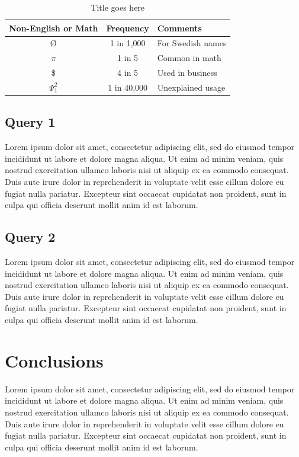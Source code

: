 \documentclass{sig-alternate-05-2015}
\begin{document}
\begin{table}
	\centering
	\caption{Title goes here}
	\begin{tabular}{|c|c|l|}
		\hline
		Non-English or Math&Frequency&Comments\\ \hline
		\O & 1 in 1,000& For Swedish names\\ \hline
		$\pi$ & 1 in 5& Common in math\\ \hline
		\$ & 4 in 5 & Used in business\\ \hline
		$\Psi^2_1$ & 1 in 40,000& Unexplained usage\\
		\hline
	\end{tabular}
\end{table}

\subsection{Query 1}
Lorem ipsum dolor sit amet, consectetur adipiscing elit, sed do eiusmod tempor incididunt ut labore et dolore magna aliqua. Ut enim ad minim veniam, quis nostrud exercitation ullamco laboris nisi ut aliquip ex ea commodo consequat. Duis aute irure dolor in reprehenderit in voluptate velit esse cillum dolore eu fugiat nulla pariatur. Excepteur sint occaecat cupidatat non proident, sunt in culpa qui officia deserunt mollit anim id est laborum.

\subsection{Query 2}
Lorem ipsum dolor sit amet, consectetur adipiscing elit, sed do eiusmod tempor incididunt ut labore et dolore magna aliqua. Ut enim ad minim veniam, quis nostrud exercitation ullamco laboris nisi ut aliquip ex ea commodo consequat. Duis aute irure dolor in reprehenderit in voluptate velit esse cillum dolore eu fugiat nulla pariatur. Excepteur sint occaecat cupidatat non proident, sunt in culpa qui officia deserunt mollit anim id est laborum.

\section{Conclusions}
Lorem ipsum dolor sit amet, consectetur adipiscing elit, sed do eiusmod tempor incididunt ut labore et dolore magna aliqua. Ut enim ad minim veniam, quis nostrud exercitation ullamco laboris nisi ut aliquip ex ea commodo consequat. Duis aute irure dolor in reprehenderit in voluptate velit esse cillum dolore eu fugiat nulla pariatur. Excepteur sint occaecat cupidatat non proident, sunt in culpa qui officia deserunt mollit anim id est laborum.
\end{document}
